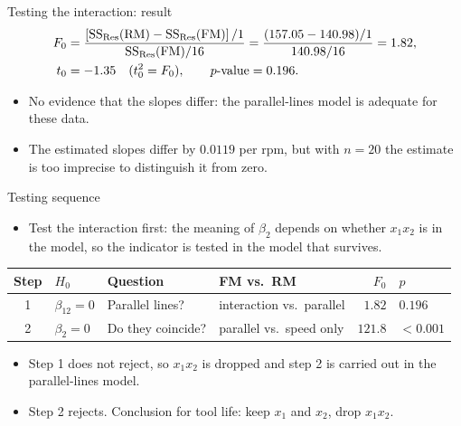 \begin{frame}{Testing the interaction: result}
    \begin{align*}
        F_0 &= \frac{\left[\mathrm{SS}_{\mathrm{Res}}(\mathrm{RM}) - \mathrm{SS}_{\mathrm{Res}}(\mathrm{FM})\right] / 1}{\mathrm{SS}_{\mathrm{Res}}(\mathrm{FM}) / 16}
        = \frac{(157.05 - 140.98)/1}{140.98/16} = 1.82, \\
        t_0 &= -1.35 \quad (t_0^2 = F_0), \qquad p\text{-value} = 0.196 .
    \end{align*}
    \begin{itemize}
        \item No evidence that the slopes differ: the parallel-lines model is adequate for these data.
        \item The estimated slopes differ by $0.0119$ per rpm, but with $n = 20$ the estimate is too imprecise to distinguish it from zero.
    \end{itemize}
\end{frame}


\begin{frame}{Testing sequence}
    \begin{itemize}
        \item Test the interaction first: the meaning of $\beta_2$ depends on whether $x_1 x_2$ is in the model, so the indicator is tested in the model that survives.
    \end{itemize}
    \vspace{0.3em}
    \centering
    \small
    \begin{tabular}{clllrl}
        \toprule
        Step & $H_0$ & Question & FM vs.\ RM & $F_0$ & $p$ \\
        \midrule
        1 & $\beta_{12} = 0$ & Parallel lines? & interaction vs.\ parallel & $1.82$ & $0.196$ \\
        2 & $\beta_2 = 0$ & Do they coincide? & parallel vs.\ speed only & $121.8$ & $< 0.001$ \\
        \bottomrule
    \end{tabular}

    \vspace{0.8em}
    \raggedright
    \begin{itemize}
        \item Step 1 does not reject, so $x_1 x_2$ is dropped and step 2 is carried out in the parallel-lines model.
        \item Step 2 rejects. Conclusion for tool life: keep $x_1$ and $x_2$, drop $x_1 x_2$.
    \end{itemize}
\end{frame}


